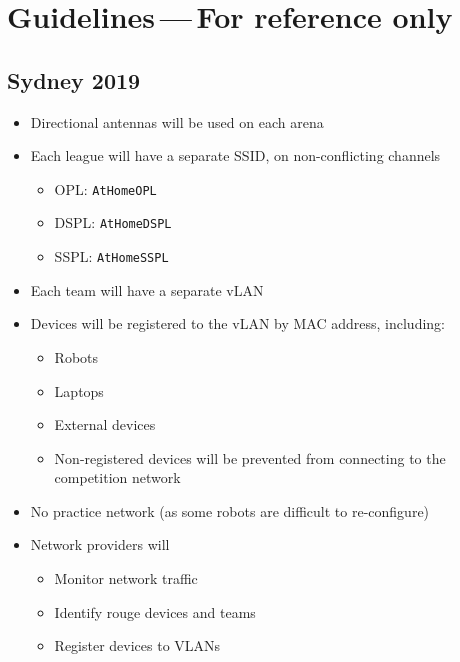 \chapter*[Guidelines]{Guidelines{\color{gray}\,---\,For reference only}}
\section{Sydney 2019}

\begin{itemize}[nosep]
	\item Directional antennas will be used on each arena
	\item Each league will have a separate SSID, on non-conflicting channels
	\begin{itemize}[nosep]
		\item OPL: \texttt{AtHomeOPL}
		\item DSPL: \texttt{AtHomeDSPL}
		\item SSPL: \texttt{AtHomeSSPL}
	\end{itemize}
	\item Each team will have a separate vLAN
	\item Devices will be registered to the vLAN by MAC address, including:
	\begin{itemize}[nosep]
		\item Robots
		\item Laptops
		\item External devices
		\item Non-registered devices will be prevented from connecting to the competition network
	\end{itemize}
	\item No practice network (as some robots are difficult to re-configure)
	\item Network providers will
	\begin{itemize}[nosep]
		\item Monitor network traffic
		\item Identify rouge devices and teams
		\item Register devices to VLANs
	\end{itemize}


\end{itemize}
